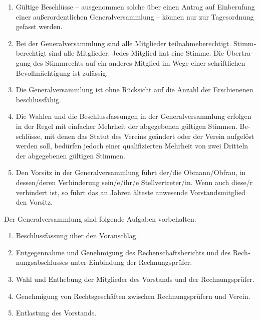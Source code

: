 \begin{otherlanguage}{german}
\begin{enumerate}[statutenenum]
    \item Gültige Beschlüsse -- ausgenommen solche über einen Antrag auf Einberufung einer außerordentlichen Generalversammlung -- können nur zur Tagesordnung gefasst werden.

    \item Bei der Generalversammlung sind alle Mitglieder teilnahmeberechtigt.
        Stimmberechtigt sind alle Mitglieder.
        Jedes Mitglied hat eine Stimme.
        Die Übertragung des Stimmrechts auf ein anderes Mitglied im Wege einer schriftlichen Bevollmächtigung ist zulässig.

    \item Die Generalversammlung ist ohne Rücksicht auf die Anzahl der Erschienenen beschlussfähig.

    \item Die Wahlen und die Beschlussfassungen in der Generalversammlung erfolgen in der Regel mit einfacher Mehrheit der abgegebenen gültigen Stimmen.
        Beschlüsse, mit denen das Statut des Vereins geändert oder der Verein aufgelöst werden soll, bedürfen jedoch einer qualifizierten Mehrheit von zwei Dritteln der abgegebenen gültigen Stimmen.

    \item Den Vorsitz in der Generalversammlung führt der/die Obmann/Obfrau, in dessen/deren Verhinderung sein/e/ihr/e Stellvertreter/in.
        Wenn auch diese/r verhindert ist, so führt das an Jahren älteste anwesende Vorstandsmitglied den Vorsitz.
\end{enumerate}


Der Generalversammlung sind folgende Aufgaben vorbehalten:

\begin{enumerate}[statutenenum]
    \item Beschlussfassung über den Voranschlag.

    \item Entgegennahme und Genehmigung des Rechenschaftsberichts und des Rechnungsabschlusses unter Einbindung der Rechnungsprüfer.

    \item Wahl und Enthebung der Mitglieder des Vorstands und der Rechnungsprüfer.

    \item Genehmigung von Rechtsgeschäften zwischen Rechnungsprüfern und Verein.

    \item Entlastung des Vorstands.


\end{enumerate}
\end{otherlanguage}

